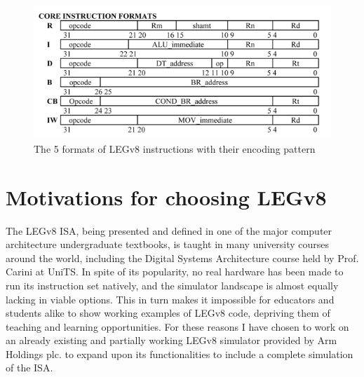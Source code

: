 \begin{figure}[H]
	\centering
	\includegraphics[width=.8\textwidth]{img/instruction_types.png}
	\caption{The 5 formats of LEGv8 instructions with their encoding pattern}
\end{figure}
\section*{Motivations for choosing LEGv8}
The LEGv8 ISA, being presented and defined in one of the major computer architecture undergraduate textbooks, is taught in many university courses around the world, including the Digital Systems Architecture course held by Prof. Carini at UniTS. In spite of its popularity, no real hardware has been made to run its instruction set natively, and the simulator landscape is almost equally lacking in viable options. This in turn makes it impossible for educators and students alike to show working examples of LEGv8 code, depriving them of teaching and learning opportunities. For these reasons I have chosen to work on an already existing and partially working LEGv8 simulator provided by Arm Holdings plc. to expand upon its functionalities to include a complete simulation of the ISA. 


